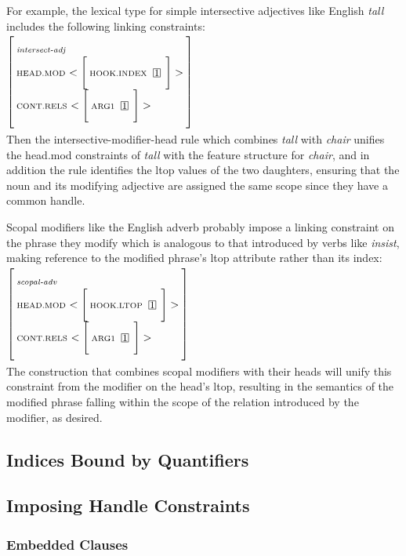 \documentclass[12pt]{article}
\newcommand{\avmplus}[1]{{\setlength{\arraycolsep}{0.8mm}	
                       \renewcommand{\arraystretch}{1.1} %
                       \left[ 			
                       \begin{array}{l}
                       \\[-2mm] #1 \\[-2mm] \\
                       \end{array} 		
                       \right]
                    }}
\newcommand{\att}[1]{{\mbox{\scriptsize {\bf #1}}}}
\newcommand{\attval}[2]{{\mbox{\scriptsize #1}\ {{#2}}}}
\newcommand{\attvallist}[2]{{\mbox{\scriptsize #1}\ {<{#2}>}}}
\newcommand{\ind}[1]{{\setlength{\fboxsep}{0.25mm} \: \fbox{{\small #1}} \:}}
\begin{document}
For example, the lexical type for simple intersective adjectives like English
{\it tall} includes the following linking constraints:\\

$\avmplus{\att{\it intersect-adj}\\
          \attvallist{HEAD.MOD}{
          \avmplus{\attval{HOOK.INDEX}{\ind{1}}}}\\
          \attvallist{CONT.RELS}{
          \avmplus{\attval{ARG1}{\ind{1}}}}}$\\

Then the intersective-modifier-head rule which combines {\it tall} with 
{\it chair} unifies the {\sc head.mod} constraints of {\it tall} with the 
feature structure for {\it chair}, and in addition the rule identifies the
{\sc ltop} values of the two daughters, ensuring that the noun and its
modifying adjective are assigned the same scope since they have a common
handle.

Scopal modifiers like the English adverb {\sc probably} impose a linking
constraint on the phrase they modify which is analogous to that introduced
by verbs like {\it insist}, making reference to the modified phrase's 
{\sc ltop} attribute rather than its {\sc index}:\\

$\avmplus{\att{\it scopal-adv}\\
          \attvallist{HEAD.MOD}{
          \avmplus{\attval{HOOK.LTOP}{\ind{1}}}}\\
          \attvallist{CONT.RELS}{
          \avmplus{\attval{ARG1}{\ind{1}}}}}$\\

The construction that combines scopal modifiers with their heads will unify
this constraint from the modifier on the head's {\sc ltop}, resulting in the
semantics of the modified phrase falling within the scope of the relation
introduced by the modifier, as desired.

\subsection{Indices Bound by Quantifiers}
\label{bvsec}

\subsection{Imposing Handle Constraints}
\label{hconssec}

\subsubsection{Embedded Clauses}
\label{msgsec}
\end{document}
